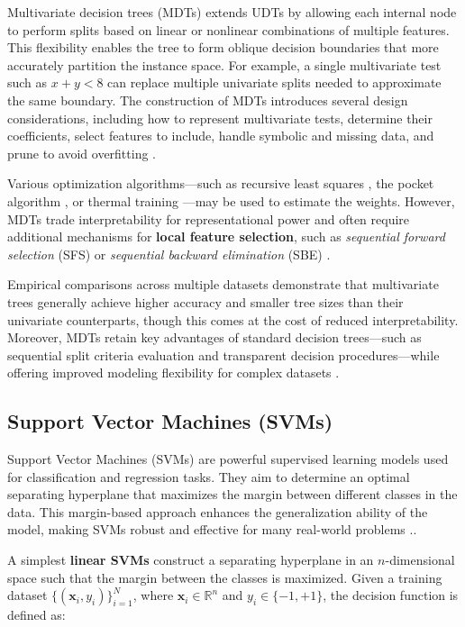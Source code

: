 Multivariate decision trees (MDTs) extends UDTs by allowing each internal node to perform splits based on linear or nonlinear combinations of multiple features. This flexibility enables the tree to form oblique decision boundaries that more accurately partition the instance space. For example, a single multivariate test such as \(x + y < 8\) can replace multiple univariate splits needed to approximate the same boundary. The construction of MDTs introduces several design considerations, including how to represent multivariate tests, determine their coefficients, select features to include, handle symbolic and missing data, and prune to avoid overfitting \citep{brodley1995}.

Various optimization algorithms---such as recursive least squares \citep{young1984}, the pocket algorithm \citep{gallant1986}, or thermal training \citep{frean1990}---may be used to estimate the weights. However, MDTs trade interpretability for representational power and often require additional mechanisms for \textbf{local feature selection}, such as \emph{sequential forward selection} (SFS) or \emph{sequential backward elimination} (SBE) \citep{kittler1986}.

Empirical comparisons across multiple datasets demonstrate that multivariate trees generally achieve higher accuracy and smaller tree sizes than their univariate counterparts, though this comes at the cost of reduced interpretability. Moreover, MDTs retain key advantages of standard decision trees---such as sequential split criteria evaluation and transparent decision procedures---while offering improved modeling flexibility for complex datasets \citep{kozial2009, friedl1997, huan1998, canete}.

\subsection{Support Vector Machines (SVMs)}\label{support-vector-machines-svms}

Support Vector Machines (SVMs) are powerful supervised learning models used for classification and regression tasks. They aim to determine an optimal separating hyperplane that maximizes the margin between different classes in the data. This margin-based approach enhances the generalization ability of the model, making SVMs robust and effective for many real-world problems \citep{cristianini2000}..

A simplest \textbf{linear SVMs} construct a separating hyperplane in an \(n\)-dimensional space such that the margin between the classes is maximized. Given a training dataset \(\{(\mathbf{x}_i, y_i)\}_{i=1}^{N}\), where \(\mathbf{x}_i \in \mathbb{R}^n\) and \(y_i \in \{-1, +1\}\), the decision function is defined as:

